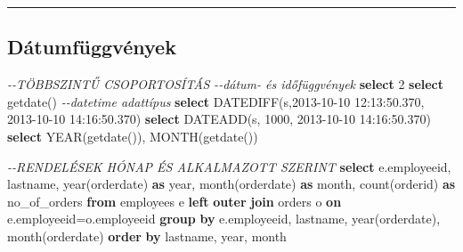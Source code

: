 \documentclass[
  magyar,
]{article}
\newenvironment{Shaded}{}{}
\newcommand{\CommentTok}[1]{\textcolor[rgb]{0.38,0.63,0.69}{\textit{#1}}}
\newcommand{\DataTypeTok}[1]{\textcolor[rgb]{0.56,0.13,0.00}{#1}}
\newcommand{\DecValTok}[1]{\textcolor[rgb]{0.25,0.63,0.44}{#1}}
\newcommand{\FunctionTok}[1]{\textcolor[rgb]{0.02,0.16,0.49}{#1}}
\newcommand{\KeywordTok}[1]{\textcolor[rgb]{0.00,0.44,0.13}{\textbf{#1}}}
\newcommand{\NormalTok}[1]{#1}
\newcommand{\OperatorTok}[1]{\textcolor[rgb]{0.40,0.40,0.40}{#1}}
\newcommand{\StringTok}[1]{\textcolor[rgb]{0.25,0.44,0.63}{#1}}
\begin{document}
\begin{center}\rule{0.5\linewidth}{0.5pt}\end{center}

\subsection{Dátumfüggvények}\label{duxe1tumfuxfcggvuxe9nyek}

\begin{Shaded}
\begin{Highlighting}[]
\CommentTok{{-}{-}TÖBBSZINTŰ CSOPORTOSÍTÁS}
\CommentTok{{-}{-}dátum{-} és időfüggvények}
\KeywordTok{select} \DecValTok{2}
\KeywordTok{select}\NormalTok{ getdate() }\CommentTok{{-}{-}datetime adattípus}
\KeywordTok{select}\NormalTok{ DATEDIFF(s,}\StringTok{\textquotesingle{}2013{-}10{-}10 12:13:50.370\textquotesingle{}}\NormalTok{, }\StringTok{\textquotesingle{}2013{-}10{-}10 14:16:50.370\textquotesingle{}}\NormalTok{)}
\KeywordTok{select}\NormalTok{ DATEADD(s, }\DecValTok{1000}\NormalTok{, }\StringTok{\textquotesingle{}2013{-}10{-}10 14:16:50.370\textquotesingle{}}\NormalTok{)}
\KeywordTok{select} \DataTypeTok{YEAR}\NormalTok{(getdate()), }\DataTypeTok{MONTH}\NormalTok{(getdate())}

\CommentTok{{-}{-}RENDELÉSEK HÓNAP ÉS ALKALMAZOTT SZERINT}
\KeywordTok{select}\NormalTok{ e.employeeid, lastname, }\DataTypeTok{year}\NormalTok{(orderdate) }\KeywordTok{as} \DataTypeTok{year}\NormalTok{, }\DataTypeTok{month}\NormalTok{(orderdate) }\KeywordTok{as} \DataTypeTok{month}\NormalTok{,}
\FunctionTok{count}\NormalTok{(orderid) }\KeywordTok{as}\NormalTok{ no\_of\_orders}
\KeywordTok{from}\NormalTok{ employees e }\KeywordTok{left} \KeywordTok{outer} \KeywordTok{join}\NormalTok{ orders o }\KeywordTok{on}\NormalTok{ e.employeeid}\OperatorTok{=}\NormalTok{o.employeeid}
\KeywordTok{group} \KeywordTok{by}\NormalTok{ e.employeeid, lastname, }\DataTypeTok{year}\NormalTok{(orderdate), }\DataTypeTok{month}\NormalTok{(orderdate)}
\KeywordTok{order} \KeywordTok{by}\NormalTok{ lastname, }\DataTypeTok{year}\NormalTok{, }\DataTypeTok{month}


\end{Highlighting}
\end{Shaded}
\end{document}
